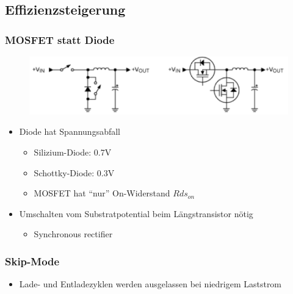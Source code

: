 \subsection{Effizienzsteigerung}
\subsubsection{MOSFET statt Diode}
\begin{figure}[htbs]
\includegraphics[scale=0.5]{pictures/effizient1}
\end{figure}
\begin{itemize}
  \item Diode hat Spannungsabfall
  \begin{itemize}
    \item Silizium-Diode: 0.7V
    \item Schottky-Diode: 0.3V
    \item MOSFET hat "`nur"' On-Widerstand $Rds_{on}$
    \end{itemize}
   \item Umschalten vom Substratpotential beim Längstransistor nötig
   \begin{itemize}
     \item Synchronous rectifier
    \end{itemize}
\end{itemize}

\subsubsection{Skip-Mode}
\begin{itemize}
  \item Lade- und Entladezyklen werden ausgelassen bei niedrigem Laststrom
\end{itemize}
